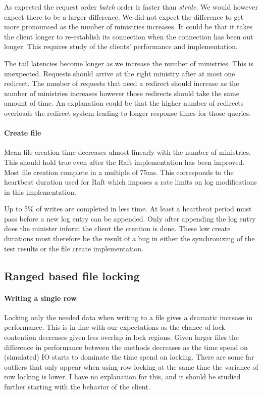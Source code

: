 As expected the request order \textit{batch} order is faster than \textit{stride}. We would however expect there to be a larger difference. We did not expect the difference to get more pronounced as the number of ministries increases. It could be that it takes the client longer to re-establish its connection when the connection has been out longer. This requires study of the clients' performance and implementation.

The tail latencies become longer as we increase the number of ministries. This is unexpected. Requests should arrive at the right ministry after at most one redirect. The number of requests that need a redirect should increase as the number of ministries increases however those redirects should take the same amount of time. An explanation could be that the higher number of redirects overloads the redirect system leading to longer response times for those queries.
%
\paragraph{Create file} 
Mean file creation time decreases almost linearly with the number of ministries. This should hold true even after the Raft implementation has been improved. Most file creation complete in a multiple of 75ms. This corresponds to the heartbeat duration used for Raft which imposes a rate limits on log modifications in this implementation. 

Up to 5\% of writes are completed in less time. At least a heartbeat period must pass before a new log entry can be appended. Only after appending the log entry does the minister inform the client the creation is done. These low create durations must therefore be the result of a bug in either the synchronizing of the test results or the file create implementation.
%
\subsection{Ranged based file locking}
\paragraph{Writing a single row}
Locking only the needed data when writing to a file gives a dramatic increase in performance. This is in line with our expectations as the chance of lock contention decreases given less overlap in lock regions. Given larger files the difference in performance between the methods decreases as the time spend on (simulated) IO starts to dominate the time spend on locking. There are some far outliers that only appear when using row locking at the same time the variance of row locking is lower. I have no explanation for this, and it should be studied further starting with the behavior of the client.

